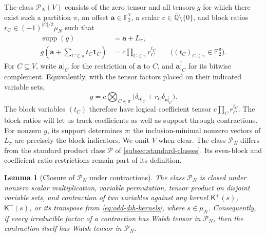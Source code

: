 \documentclass[11pt,letterpaper,onecolumn]{article}
\theoremstyle{plain}
\newtheorem{lemma}[lemma]{Lemma}
\theoremstyle{definition}
\theoremstyle{remark}
\newcommand{\AlgNums}{\overline{\mathbb Q}}
\newcommand{\Ftwo}{\mathbb F_2}
\newcommand{\cP}{\mathscr P}
\newcommand{\supp}{\operatorname{supp}}
\newcommand{\one}{\mathbf 1}
\begin{document}
	The class \(\mathcal P_N(V)\) consists of the zero tensor and
	all tensors \(g\) for which there exist such a partition \(\pi\), an offset
	\({\mathbf a}\in\Ftwo^V\), a scalar \(c\in\AlgNums\setminus\{0\}\), and block ratios
	\(r_C\in(-1)^{|C|/2}\mu_N\) such that
	\begin{align*}
		\supp(g)&={\mathbf a}+L_\pi,
		\\
		g\!\left({\mathbf a}+\sum_{C\in\pi}t_C\one_C\right)
		&=c\prod_{C\in\pi}r_C^{t_C}
		\qquad\bigl((t_C)_{C\in\pi}\in\Ftwo^\pi\bigr).
	\end{align*}
	For \(C\subseteq V\), write \({\mathbf a}|_C\) for the restriction of \({\mathbf a}\) to \(C\),
	and \(\overline{{\mathbf a}|_C}\) for its bitwise complement.
	Equivalently, with the tensor factors placed on their indicated variable sets,
	\[
	g=c\bigotimes_{C\in\pi}
	\bigl(\delta_{{\mathbf a}|_C}+r_C\delta_{\overline{{\mathbf a}|_C}}\bigr).
	\]
	The block variables \((t_C)\) therefore have logical coefficient tensor
	\(c\prod_C r_C^{t_C}\). The block ratios will let us track coefficients
	as well as support through contractions.  For nonzero \(g\), its support
	determines \(\pi\): the inclusion-minimal nonzero vectors of \(L_\pi\) are
	precisely the block indicators.  We omit \(V\) when clear.  The class
	\(\mathcal P_N\) differs from the standard product class \(\cP\) of
	\cref{subsec:standard-classes}. Its even-block and coefficient-ratio
	restrictions remain part of its definition.
	
	\begin{lemma}[Closure of \(\mathcal P_N\) under contractions]
		\label{lem:phase-product-closure}
		The class \(\mathcal P_N\) is closed under nonzero scalar multiplication,
		variable permutation, tensor product on disjoint variable sets, and
		contraction of two variables against any kernel
		\(\mathsf K^+(s)\), \(\mathsf K^-(s)\), or its transpose from
		\cref{eq:odd-dih-kernels}, where \(s\in\mu_N\).  Consequently, if
		every irreducible factor of a contraction has Walsh tensor in
		\(\mathcal P_N\), then the contraction itself has Walsh tensor in
		\(\mathcal P_N\).
	\end{lemma}
	
\end{document}
